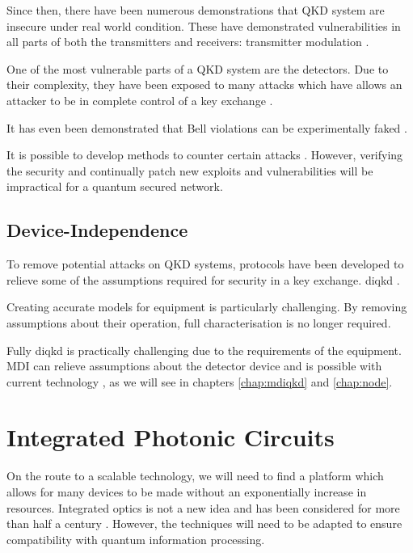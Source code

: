 Since then, there have been numerous demonstrations that \ac{QKD} system are insecure under real world condition. These have demonstrated vulnerabilities in all parts of both the transmitters and receivers: transmitter modulation \cite{Gisin2006}. 

One of the most vulnerable parts of a \ac{QKD} system are the detectors. Due to their complexity, they have been exposed to many attacks which have allows an attacker to be in complete control of a key exchange \cite{Makarov2006, Gerhardt2011a, Lydersen2010a, Lydersen2010b, Lydersen2011, Sauge2011, Makarov2009, Wiechers2011}.

It has even been demonstrated that Bell violations can be experimentally faked \cite{Gerhardt2011b}.

It is possible to develop methods to counter certain attacks \cite{Lydersen2010c, Yuan2010}. However, verifying the security and continually patch new exploits and vulnerabilities will be impractical for a quantum secured network.

\subsection{Device-Independence}

To remove potential attacks on \ac{QKD} systems, protocols have been developed to relieve some of the assumptions required for security in a key exchange. \Ac{diqkd}  \cite{Acin2007, Barrett2005, Mayers1998}. 

Creating accurate models for equipment is particularly challenging. By removing assumptions about their operation, full characterisation is no longer required.

Fully \ac{diqkd} is practically challenging due to the requirements of the equipment. \ac{MDI} can relieve assumptions about the detector device and is possible with current technology \cite{mdi-qkd}, as we will see in chapters \ref{chap:mdiqkd} and \ref{chap:node}. 

\section{Integrated Photonic Circuits}

On the route to a scalable technology, we will need to find a platform which allows for many devices to be made without an exponentially increase in resources. Integrated optics is not a new idea and has been considered for more than half a century \cite{miller1969}. However, the techniques will need to be adapted to ensure compatibility with quantum information processing.

